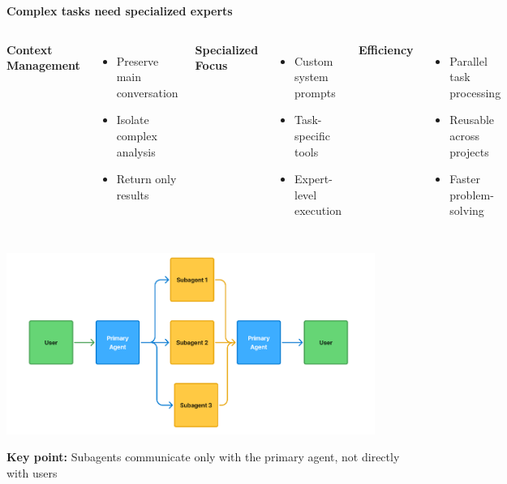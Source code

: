 \documentclass[aspectratio=169]{beamer}
\begin{document}
\begin{frame}

\vspace{0.5cm}
\centering
\Large
\textbf{Complex tasks need specialized experts}

\vspace{1cm}

\begin{columns}[t]

\centering
\textbf{\large Context Management}
\vspace{0.4cm}

\normalsize
\begin{itemize}
\item Preserve main conversation
\item Isolate complex analysis
\item Return only results
\end{itemize}

\centering
\textbf{\large Specialized Focus}
\vspace{0.4cm}

\normalsize
\begin{itemize}
\item Custom system prompts
\item Task-specific tools
\item Expert-level execution
\end{itemize}

\centering
\textbf{\large Efficiency}
\vspace{0.4cm}

\normalsize
\begin{itemize}
\item Parallel task processing
\item Reusable across projects
\item Faster problem-solving
\end{itemize}

\end{columns}

\end{frame}

\begin{frame}

\includegraphics[width=0.9\textwidth]{figures/fig_subagents.png}

{\small
\textbf{Key point:} Subagents communicate only with the primary agent, not directly with users}

\end{frame}
\end{document}
